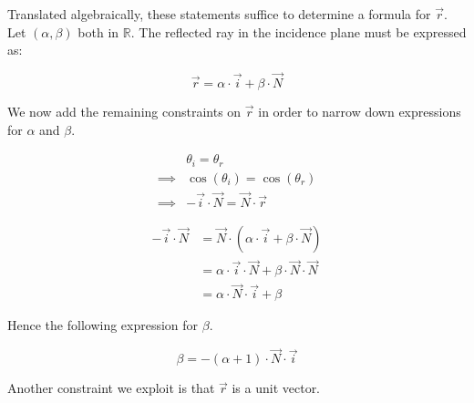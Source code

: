 Translated algebraically, these statements suffice to determine a formula for
$\overrightarrow{r}$. Let $(\alpha, \beta)$ both in $\mathbb{R}$. The reflected
ray in the incidence plane must be expressed as:

\begin{equation}
\overrightarrow{r} = \alpha \cdot \overrightarrow{i} +
                     \beta \cdot \overrightarrow{N}
\end{equation}

We now add the remaining constraints on $\overrightarrow{r}$ in order to narrow
down expressions for $\alpha$ and $\beta$.

\begin{equation} \begin{split}
& \theta_i = \theta_r \\
\implies & \cos(\theta_i) = \cos(\theta_r) \\
\implies & - \overrightarrow{i} \cdot \overrightarrow{N} =
       \overrightarrow{N} \cdot \overrightarrow{r}
\end{split} \end{equation}

\begin{equation} \begin{split}
- \overrightarrow{i} \cdot \overrightarrow{N} &=
\overrightarrow{N} \cdot
(\alpha \cdot \overrightarrow{i} + \beta \cdot \overrightarrow{N}) \\
&= \alpha \cdot \overrightarrow{i} \cdot \overrightarrow{N} +
   \beta \cdot \overrightarrow{N} \cdot \overrightarrow{N} \\
&= \alpha \cdot \overrightarrow{N} \cdot \overrightarrow{i} + \beta
\end{split} \end{equation}

Hence the following expression for $\beta$.

\begin{equation} \label{eq:reflect-beta-expr}
\beta = - (\alpha + 1) \cdot \overrightarrow{N} \cdot \overrightarrow{i}
\end{equation}

Another constraint we exploit is that $\overrightarrow{r}$ is a unit vector.

